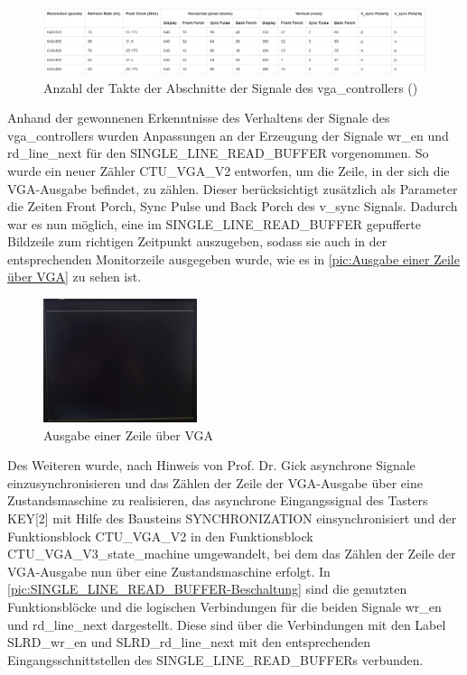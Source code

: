 \documentclass[ngerman,12pt]{article} %
\begin{document}
{\begin{figure}[htbp]
	\begin{center}
	\includegraphics[width = 1\textwidth]{vga_timing_2}
	\caption [Anzahl der Takte der Abschnitte der Signale des vga\_controllers]{\label{pic:vga_timing_2}Anzahl der Takte der Abschnitte der Signale des vga\_controllers (\cite{Digi-Key}) }
	\end{center}
\end{figure}

Anhand der gewonnenen Erkenntnisse des Verhaltens der Signale des vga\_controllers wurden Anpassungen an der Erzeugung der Signale wr\_en und rd\_line\_next für den SINGLE\_LINE\_READ\_BUFFER vorgenommen. So wurde ein neuer Zähler CTU\_VGA\_V2 entworfen, um die Zeile, in der sich die VGA-Ausgabe befindet, zu zählen. Dieser berücksichtigt zusätzlich als Parameter die Zeiten Front Porch, Sync Pulse und Back Porch des v\_sync Signals. Dadurch war es nun möglich, eine im SINGLE\_LINE\_READ\_BUFFER gepufferte Bildzeile zum richtigen Zeitpunkt auszugeben, sodass sie auch in der entsprechenden Monitorzeile ausgegeben wurde, wie es in \autoref{pic:Ausgabe einer Zeile über VGA} zu sehen ist.

\begin{figure}[htbp]
	\begin{center}
	\includegraphics[width = 0.4\textwidth]{IMG_20191217_103944_bearbeitet_2}
	\caption[Ausgabe einer Zeile über VGA]{\label{pic:Ausgabe einer Zeile über VGA}Ausgabe einer Zeile über VGA}
	\end{center}
\end{figure}

Des Weiteren wurde, nach Hinweis von Prof. Dr. Gick asynchrone Signale einzusynchronisieren und das Zählen der Zeile der VGA-Ausgabe über eine Zustandsmaschine zu realisieren, das asynchrone Eingangssignal des Tasters KEY[2] mit Hilfe des Bausteins SYNCHRONIZATION einsynchronisiert und der Funktionsblock CTU\_VGA\_V2 in den Funktionsblock CTU\_VGA\_V3\_state\_machine umgewandelt, bei dem das Zählen der Zeile der VGA-Ausgabe nun über eine Zustandsmaschine erfolgt. In \autoref{pic:SINGLE_LINE_READ_BUFFER-Beschaltung} sind die genutzten Funktionsblöcke und die logischen Verbindungen für die beiden Signale wr\_en und rd\_line\_next dargestellt. Diese sind über die Verbindungen mit den Label SLRD\_wr\_en und SLRD\_rd\_line\_next mit den entsprechenden Eingangsschnittstellen des SINGLE\_LINE\_READ\_BUFFERs verbunden.\newline

}
\end{document}
